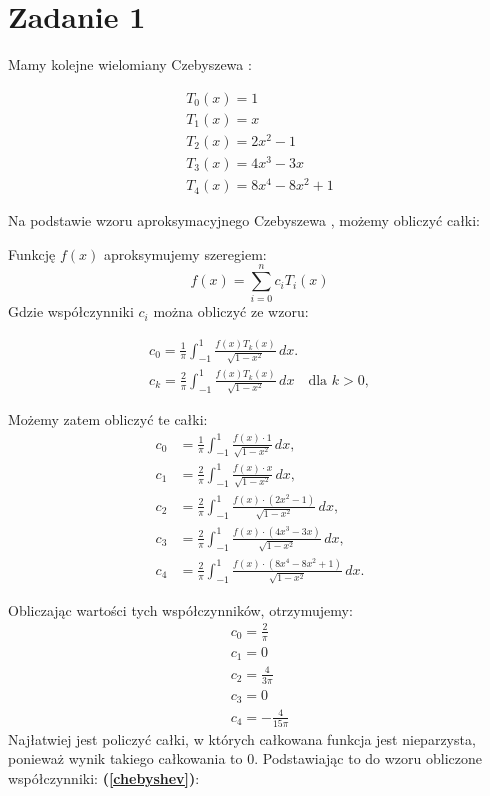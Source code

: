 \documentclass{article}
\begin{document}
\section*{Zadanie 1}

Mamy kolejne wielomiany Czebyszewa \cite{wiki:Chebyshev_polynomials}:

\begin{align*}
    T_{0}(x) = 1 \\
    T_{1}(x) = x \\
    T_{2}(x) = 2x^2 - 1 \\
    T_{3}(x) = 4x^3 - 3x \\
    T_{4}(x) = 8x^4 -  8x^2 + 1
\end{align*}

Na podstawie wzoru aproksymacyjnego Czebyszewa \cite{wiki:Chebyshev_polynomials, Funika}, możemy obliczyć całki:

Funkcję $f(x)$ aproksymujemy szeregiem:
\begin{equation}
    f(x) = \sum_{i=0}^n c_{i} T_{i}(x)    
    \label{chebyshev}
\end{equation}
Gdzie współczynniki $c_i$ można obliczyć ze wzoru:

\begin{align*}
    c_0 = \frac{1}{\pi} \int_{-1}^{1} \frac{f(x)T_k(x)} {\sqrt{1 - x^2}} \, dx. \\
c_k = \frac{2}{\pi} \int_{-1}^{1} \frac{f(x) T_k(x)}{\sqrt{1 - x^2}} \, dx \quad \text{dla } k > 0,  
\end{align*}

Możemy zatem obliczyć te całki:
\begin{align*}
c_0 &= \frac{1}{\pi} \int_{-1}^{1} \frac{f(x) \cdot 1}{\sqrt{1 - x^2}} \, dx, \\
c_1 &= \frac{2}{\pi} \int_{-1}^{1} \frac{f(x) \cdot x}{\sqrt{1 - x^2}} \, dx, \\
c_2 &= \frac{2}{\pi} \int_{-1}^{1} \frac{f(x) \cdot (2x^2 - 1)}{\sqrt{1 - x^2}} \, dx, \\
c_3 &= \frac{2}{\pi} \int_{-1}^{1} \frac{f(x) \cdot (4x^3 - 3x)}{\sqrt{1 - x^2}} \, dx, \\
c_4 &= \frac{2}{\pi} \int_{-1}^{1} \frac{f(x) \cdot (8x^4 - 8x^2 + 1)}{\sqrt{1 - x^2}} \, dx.
\end{align*}

Obliczając wartości tych współczynników, otrzymujemy:
\begin{align*}
    c_0 = \frac{2}{\pi} \\
    c_1 = 0 \\
    c_2 = \frac{4}{3\pi} \\
    c_3 = 0 \\ 
    c_4 = - \frac{4}{15 \pi}
\end{align*}
Najłatwiej jest policzyć całki, w których całkowana funkcja jest nieparzysta, ponieważ wynik takiego całkowania to 0.
Podstawiając to do wzoru obliczone współczynniki: \textbf{(\ref{chebyshev})}:
\end{document}
